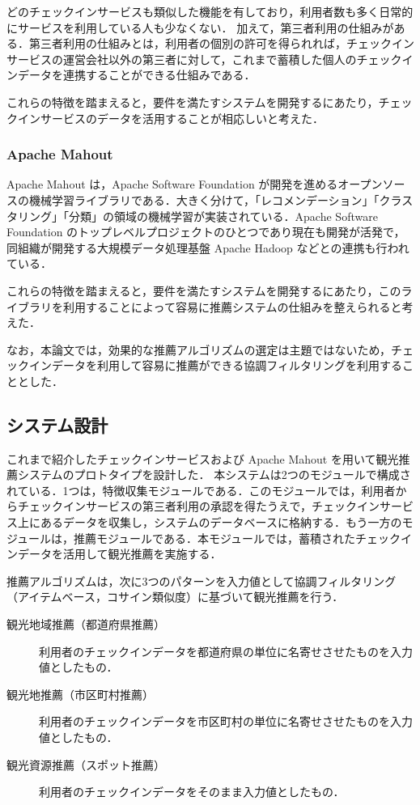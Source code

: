\documentclass{jsarticle}
\begin{document}
どのチェックインサービスも類似した機能を有しており，利用者数も多く日常的にサービスを利用している人も少なくない．
加えて，第三者利用の仕組みがある．第三者利用の仕組みとは，利用者の個別の許可を得られれば，チェックインサービスの運営会社以外の第三者に対して，これまで蓄積した個人のチェックインデータを連携することができる仕組みである．

これらの特徴を踏まえると，要件を満たすシステムを開発するにあたり，チェックインサービスのデータを活用することが相応しいと考えた．

\subsubsection{Apache Mahout}

Apache Mahout は，Apache Software Foundation が開発を進めるオープンソースの機械学習ライブラリである\cite{mahout}．大きく分けて，「レコメンデーション」「クラスタリング」「分類」の領域の機械学習が実装されている．Apache Software Foundation のトップレベルプロジェクトのひとつであり現在も開発が活発で，同組織が開発する大規模データ処理基盤 Apache Hadoop などとの連携も行われている．

これらの特徴を踏まえると，要件を満たすシステムを開発するにあたり，このライブラリを利用することによって容易に推薦システムの仕組みを整えられると考えた．

なお，本論文では，効果的な推薦アルゴリズムの選定は主題ではないため，チェックインデータを利用して容易に推薦ができる協調フィルタリングを利用することとした．

\subsection{システム設計}

これまで紹介したチェックインサービスおよび Apache Mahout を用いて観光推薦システムのプロトタイプを設計した．
本システムは2つのモジュールで構成されている．1つは，特徴収集モジュールである．このモジュールでは，利用者からチェックインサービスの第三者利用の承認を得たうえで，チェックインサービス上にあるデータを収集し，システムのデータベースに格納する．もう一方のモジュールは，推薦モジュールである．本モジュールでは，蓄積されたチェックインデータを活用して観光推薦を実施する．

推薦アルゴリズムは，次に3つのパターンを入力値として協調フィルタリング（アイテムベース，コサイン類似度）に基づいて観光推薦を行う．

\begin{description}
\item[観光地域推薦（都道府県推薦）] 利用者のチェックインデータを都道府県の単位に名寄せさせたものを入力値としたもの．
\item[観光地推薦（市区町村推薦）] 利用者のチェックインデータを市区町村の単位に名寄せさせたものを入力値としたもの．
\item[観光資源推薦（スポット推薦）] 利用者のチェックインデータをそのまま入力値としたもの．
\end{description}
\end{document}
